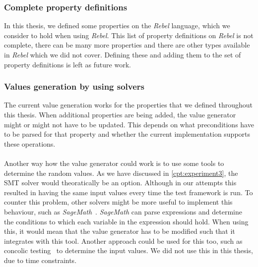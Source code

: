 \subsubsection{Complete property definitions}
In this thesis, we defined some properties on the \textit{Rebel} language,
which we consider to hold when using \textit{Rebel}. This list of property
definitions on \textit{Rebel} is not complete, there can be many more properties
and there are other types available in \textit{Rebel} which we did not cover.
Defining these and adding them to the set of property definitions is left as
future work.

\subsubsection{Values generation by using solvers}
The current value generation works for the properties that we defined throughout this thesis. When additional properties are being added, the value generator might or might not have to be updated. This depends on what preconditions have to be parsed for that property and whether the current implementation supports these operations.\\%
\\
Another way how the value generator could work is to use some tools to determine the random values. As we have discussed in \autoref{cpt:experiment3}, the SMT solver would theoratically be an option. Although in our attempts this resulted in having the same input values every time the test framework is run. To counter this problem, other solvers might be more useful to implement this behaviour, such as \textit{SageMath}~\cite{siteSageMath2017}. \textit{SageMath} can parse expressions and determine the conditions to which each variable in the expression should hold. When using this, it would mean that the value generator has to be modified such that it integrates with this tool. Another approach could be used for this too, such as concolic testing~\cite{sen2006cute} to determine the input values. We did not use this in this thesis, due to time constraints.

